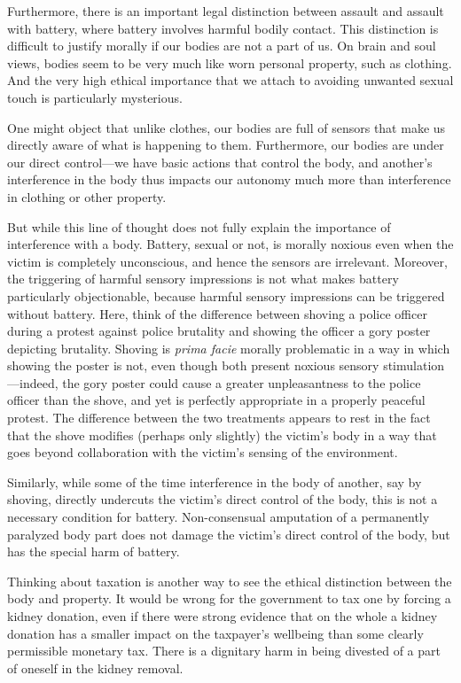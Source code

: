 Furthermore, there is an important legal distinction between assault and assault with battery, where
battery involves harmful bodily contact. This distinction is difficult to justify morally
if our bodies are not a part of us. On brain and soul views, bodies seem to be very much 
like worn personal property, such as clothing. And the very high ethical importance that we 
attach to avoiding unwanted sexual touch is particularly mysterious.

One might object that unlike clothes, our bodies are full of sensors that make us directly
aware of what is happening to them. Furthermore, our bodies are under our direct control---we have 
basic actions that control the body, and another's interference in the body thus impacts our 
autonomy much more than interference in clothing or other property. 

But while this line of thought does not fully explain the importance of interference with a body. 
Battery, sexual or not, is morally noxious even when the victim is completely unconscious, and 
hence the sensors are irrelevant. Moreover, the triggering of harmful sensory impressions
is not what makes battery particularly objectionable, because harmful sensory impressions can 
be triggered without battery. Here, think of the difference between shoving a police officer 
during a protest against police brutality and showing the officer a gory poster depicting 
brutality. Shoving is \textit{prima facie} morally problematic in a way in which showing 
the poster is not, even though both present noxious sensory stimulation---indeed, the gory poster
could cause a greater unpleasantness to the police officer than the shove, and yet is perfectly
appropriate in a properly peaceful protest. The difference between 
the two treatments appears to rest in the fact that the shove modifies (perhaps only slightly) the victim's body 
in a way that goes beyond collaboration with the victim's sensing of the environment.

Similarly, while some of the time interference in the body of another, say by shoving, directly 
undercuts the victim's direct control of the body, this is not a necessary condition for battery.
Non-consensual amputation of a permanently paralyzed body part does not damage the victim's direct
control of the body, but has the special harm of battery.

Thinking about taxation is another way to see the ethical distinction between the body and property.
It would be wrong for the government to tax one by forcing a kidney donation, even if there were strong
evidence that on the whole a kidney donation has a smaller impact on the taxpayer's wellbeing than some
clearly permissible monetary tax. There is a dignitary harm in being divested of a part of oneself in the 
kidney removal.

